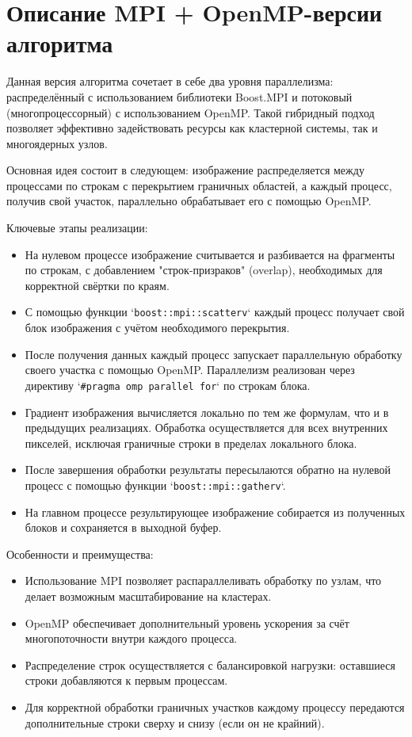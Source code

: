 \documentclass[14pt,a4paper]{extarticle}
\begin{document}
\section{Описание MPI + OpenMP-версии алгоритма}

Данная версия алгоритма сочетает в себе два уровня параллелизма: распределённый с использованием библиотеки Boost.MPI и потоковый (многопроцессорный) с использованием OpenMP. 
Такой гибридный подход позволяет эффективно задействовать ресурсы как кластерной системы, так и многоядерных узлов.

Основная идея состоит в следующем: изображение распределяется между процессами по строкам с перекрытием граничных областей, а каждый процесс, 
получив свой участок, параллельно обрабатывает его с помощью OpenMP.

Ключевые этапы реализации:

\begin{itemize}
    \item На нулевом процессе изображение считывается и разбивается на фрагменты по строкам, с добавлением "строк-призраков" (overlap), необходимых для корректной свёртки по краям.
    \item С помощью функции `\texttt{boost::mpi::scatterv}` каждый процесс получает свой блок изображения с учётом необходимого перекрытия.
    \item После получения данных каждый процесс запускает параллельную обработку своего участка с помощью OpenMP. 
    Параллелизм реализован через директиву `\texttt{\#pragma omp parallel for}` по строкам блока.
    \item Градиент изображения вычисляется локально по тем же формулам, что и в предыдущих реализациях. 
    Обработка осуществляется для всех внутренних пикселей, исключая граничные строки в пределах локального блока.
    \item После завершения обработки результаты пересылаются обратно на нулевой процесс с помощью функции `\texttt{boost::mpi::gatherv}`.
    \item На главном процессе результирующее изображение собирается из полученных блоков и сохраняется в выходной буфер.
\end{itemize}

Особенности и преимущества:

\begin{itemize}
    \item Использование MPI позволяет распараллеливать обработку по узлам, что делает возможным масштабирование на кластерах.
    \item OpenMP обеспечивает дополнительный уровень ускорения за счёт многопоточности внутри каждого процесса.
    \item Распределение строк осуществляется с балансировкой нагрузки: оставшиеся строки добавляются к первым процессам.
    \item Для корректной обработки граничных участков каждому процессу передаются дополнительные строки сверху и снизу (если он не крайний).
\end{itemize}
\end{document}

